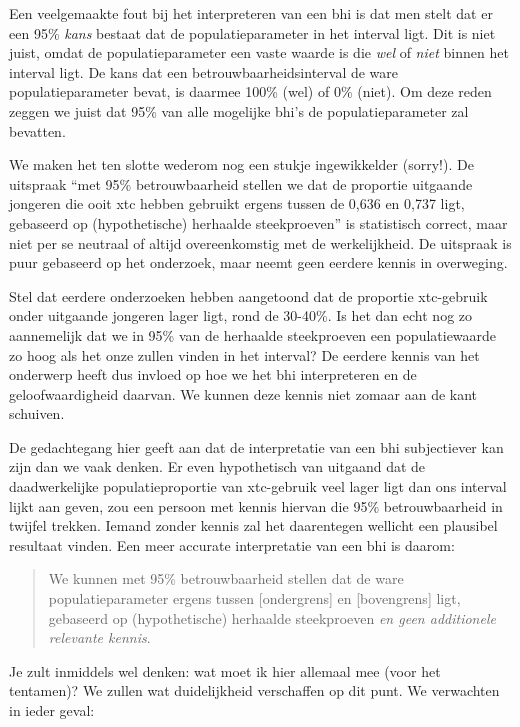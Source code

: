 \documentclass[
  letterpaper,
  DIV=11,
  numbers=noendperiod]{scrreprt}
\begin{document}
Een veelgemaakte fout bij het interpreteren van een bhi is dat men stelt
dat er een 95\% \emph{kans} bestaat dat de populatieparameter in het
interval ligt. Dit is niet juist, omdat de populatieparameter een vaste
waarde is die \emph{wel} of \emph{niet} binnen het interval ligt. De
kans dat een betrouwbaarheidsinterval de ware populatieparameter bevat,
is daarmee 100\% (wel) of 0\% (niet). Om deze reden zeggen we juist dat
95\% van alle mogelijke bhi's de populatieparameter zal bevatten.

We maken het ten slotte wederom nog een stukje ingewikkelder (sorry!).
De uitspraak ``met 95\% betrouwbaarheid stellen we dat de proportie
uitgaande jongeren die ooit xtc hebben gebruikt ergens tussen de 0,636
en 0,737 ligt, gebaseerd op (hypothetische) herhaalde steekproeven'' is
statistisch correct, maar niet per se neutraal of altijd overeenkomstig
met de werkelijkheid. De uitspraak is puur gebaseerd op het onderzoek,
maar neemt geen eerdere kennis in overweging.

Stel dat eerdere onderzoeken hebben aangetoond dat de proportie
xtc-gebruik onder uitgaande jongeren lager ligt, rond de 30-40\%. Is het
dan echt nog zo aannemelijk dat we in 95\% van de herhaalde steekproeven
een populatiewaarde zo hoog als het onze zullen vinden in het interval?
De eerdere kennis van het onderwerp heeft dus invloed op hoe we het bhi
interpreteren en de geloofwaardigheid daarvan. We kunnen deze kennis
niet zomaar aan de kant schuiven.

De gedachtegang hier geeft aan dat de interpretatie van een bhi
subjectiever kan zijn dan we vaak denken. Er even hypothetisch van
uitgaand dat de daadwerkelijke populatieproportie van xtc-gebruik veel
lager ligt dan ons interval lijkt aan geven, zou een persoon met kennis
hiervan die 95\% betrouwbaarheid in twijfel trekken. Iemand zonder
kennis zal het daarentegen wellicht een plausibel resultaat vinden. Een
meer accurate interpretatie van een bhi is daarom:

\begin{quote}
We kunnen met 95\% betrouwbaarheid stellen dat de ware
populatieparameter ergens tussen {[}ondergrens{]} en {[}bovengrens{]}
ligt, gebaseerd op (hypothetische) herhaalde steekproeven \emph{en geen
additionele relevante kennis}.
\end{quote}

Je zult inmiddels wel denken: wat moet ik hier allemaal mee (voor het
tentamen)? We zullen wat duidelijkheid verschaffen op dit punt. We
verwachten in ieder geval:
\end{document}
